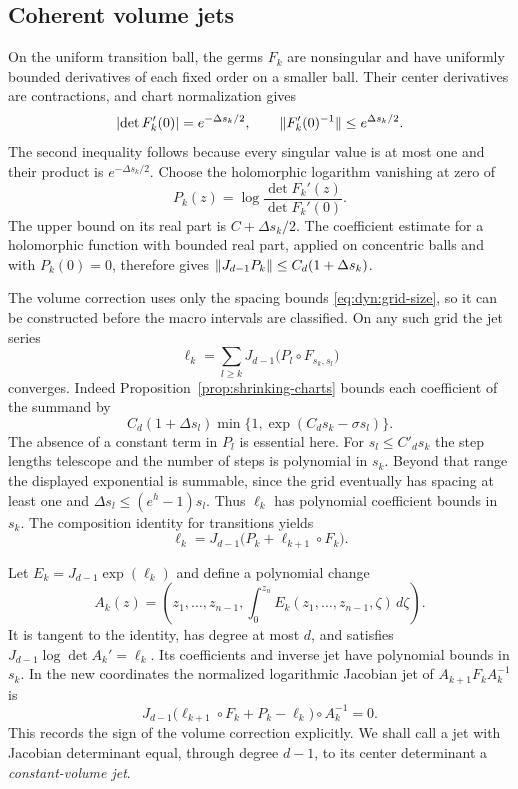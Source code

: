 \subsection{Coherent volume jets}

On the uniform transition ball, the germs $F_k$ are nonsingular and have
uniformly bounded derivatives of each fixed order on a smaller ball.
Their center derivatives are contractions, and chart normalization gives
\begin{equation}
 \lvert\det F_k'(0)\rvert=e^{-\Delta s_k/2},\qquad
 \lVert F_k'(0)^{-1}\rVert\le e^{\Delta s_k/2}.
 \label{eq:dyn:transition-linear}
\end{equation}
The second inequality follows because every singular value is at most
one and their product is $e^{-\Delta s_k/2}$.
Choose the holomorphic logarithm vanishing at zero of
\[
 P_k(z)=\log\frac{\det F_k'(z)}{\det F_k'(0)}.
\]
The upper bound on its real part is $C+\Delta s_k/2$.  The coefficient
estimate for a holomorphic function with bounded real part, applied on
concentric balls and with $P_k(0)=0$, therefore gives
$\lVert J_{d-1}P_k\rVert\le C_d(1+\Delta s_k)$.

The volume correction uses only the spacing bounds
\eqref{eq:dyn:grid-size}, so it can be constructed before the macro
intervals are classified.  On any such grid the jet series
\begin{equation}
 \ell_k=\sum_{l\ge k}J_{d-1}
       \bigl(P_l\circ F_{s_k,s_l}\bigr)
 \label{eq:dyn:volume-series}
\end{equation}
converges.  Indeed Proposition~\ref{prop:shrinking-charts} bounds each
coefficient of the summand by
\[
 C_d(1+\Delta s_l)
       \min\{1,\exp(C_d s_k-\sigma s_l)\}.
\]
The absence of a constant term in $P_l$ is essential here.  For
$s_l\le C'_d s_k$ the step lengths telescope and the number of steps is
polynomial in $s_k$.  Beyond that range the displayed exponential is
summable, since the grid eventually has spacing at least one and
$\Delta s_l\le(e^h-1)s_l$.  Thus $\ell_k$ has polynomial coefficient
bounds in $s_k$.  The composition identity for transitions yields
\begin{equation}
 \ell_k=J_{d-1}\bigl(P_k+\ell_{k+1}\circ F_k\bigr).
 \label{eq:dyn:volume-cocycle}
\end{equation}

Let $E_k=J_{d-1}\exp(\ell_k)$ and define a polynomial change
\[
 A_k(z)=\left(z_1,\ldots,z_{n-1},
       \int_0^{z_n}E_k(z_1,\ldots,z_{n-1},\zeta)\,d\zeta\right).
\]
It is tangent to the identity, has degree at most $d$, and satisfies
$J_{d-1}\log\det A_k'=\ell_k$.  Its coefficients and inverse jet have
polynomial bounds in $s_k$.  In the new coordinates the normalized
logarithmic Jacobian jet of $A_{k+1}F_kA_k^{-1}$ is
\[
 J_{d-1}\bigl(\ell_{k+1}\circ F_k+P_k-\ell_k\bigr)\circ A_k^{-1}=0.
\]
This records the sign of the volume correction explicitly.  We shall
call a jet with Jacobian determinant equal, through degree $d-1$, to
its center determinant a \emph{constant-volume jet}.

